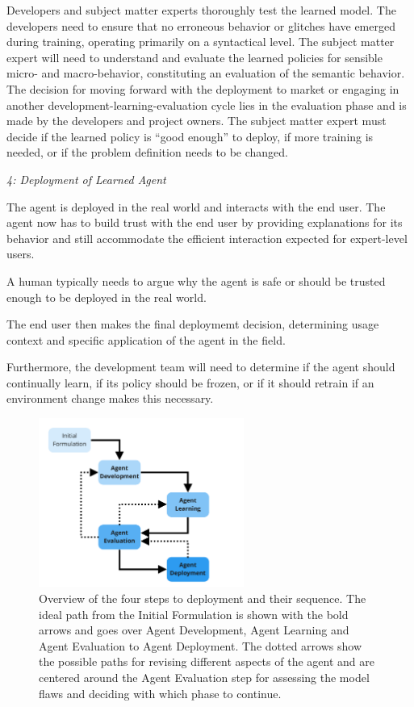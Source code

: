 \documentclass[twoside,11pt]{article}
\begin{document}
Developers and subject matter experts thoroughly test the learned model.
The developers need to ensure that no erroneous behavior or glitches have emerged during training, operating primarily on a syntactical level. The subject matter expert will need to understand and evaluate the learned policies for sensible micro- and macro-behavior, constituting an evaluation of the semantic behavior. The decision for moving forward with the deployment to market or engaging in another development-learning-evaluation cycle lies in the evaluation phase and is made by the developers and project owners. The subject matter expert must decide if the learned policy is 
``good enough'' 
to deploy, if more training is needed, or if the problem definition needs to be changed. 
\vspace{2mm}

\emph{4: Deployment of Learned Agent}

The agent is deployed in the real world and interacts with the end user. The agent now has to build trust with the end user by providing explanations for its behavior and still accommodate the efficient interaction expected for expert-level users. 

A human typically needs to argue why the agent is safe or should be trusted enough to be deployed in the real world.

The end user then makes the final deploymemt decision, determining usage context and specific application of the agent in the field.

Furthermore, the development team will need to determine if the agent should continually learn, if its policy should be frozen, or if it should retrain if an environment change makes this necessary. 
\vspace{2mm}

\begin{figure}[h]
    \centering
    \includegraphics[width=0.6\textwidth]{img/HITL Deployment Workflow.pdf}
    \caption{Overview of the four steps to deployment and their sequence. The ideal path from the Initial Formulation is shown with the bold arrows and goes over Agent Development, Agent Learning and Agent Evaluation to Agent Deployment. The dotted arrows show the possible paths for revising different aspects of the agent and are centered around the Agent Evaluation step for assessing the model flaws and deciding 
	with which phase to continue.}
    \label{fig:Deployment_Workflow}
\end{figure}
\end{document}
